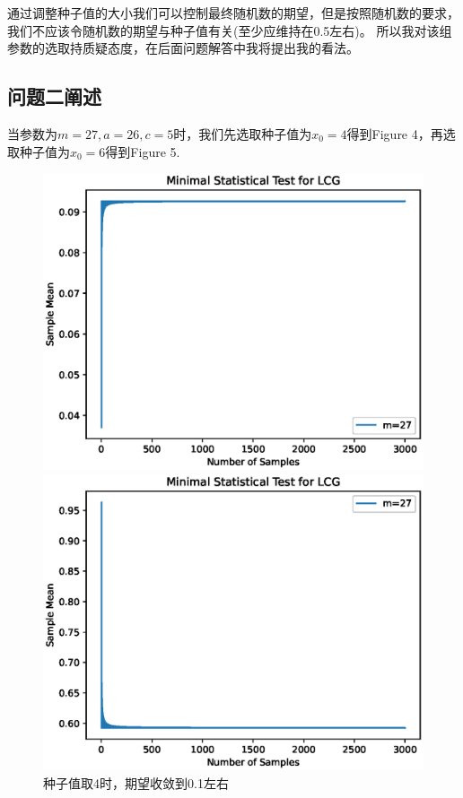 \documentclass[12pt,a4paper]{article}%
\begin{document}
    通过调整种子值的大小我们可以控制最终随机数的期望，但是按照随机数的要求，我们不应该令随机数的期望与种子值有关(至少应维持在0.5左右)。
    所以我对该组参数的选取持质疑态度，在后面问题解答中我将提出我的看法。

    \subsection{问题二阐述}
    当参数为$m=27,a=26,c=5$时，我们先选取种子值为$x_0=4$得到Figure 4，再选取种子值为$x_0=6$得到Figure 5.

    \begin{figure}[H]%
        \centering
        \begin{minipage}{0.48\textwidth}
            \centering
            \includegraphics[width=1.1\textwidth]{Problem_2.1}
            \caption{\fontsize{10pt}{15pt}\selectfont 种子值取4时，期望收敛到0.1左右}
        \end{minipage}
        \hspace{0cm}%
        \hfill%
        \begin{minipage}{0.48\textwidth}
            \centering
            \includegraphics[width=1.1\textwidth]{Problem_2.2}

\end{minipage}
\end{figure}
\end{document}
